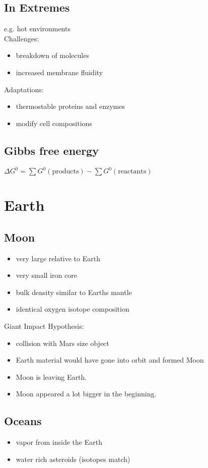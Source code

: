 \documentclass{article}
\theoremstyle{sltheorem}
\begin{document}
\subsection{In Extremes}
e.g. hot environments\\
Challenges:
\begin{itemize}
    \item breakdown of molecules
    \item increased membrane fluidity
\end{itemize}
Adaptations:
\begin{itemize}
    \item thermostable proteins and enzymes
    \item modify cell compositions
\end{itemize}
\subsection{Gibbs free energy}
$\Delta G^0 =\sum G^0(\text{products}) - \sum G^0(\text{reactants})$
\section{Earth}
\subsection{Moon}
\begin{itemize}
    \item very large relative to Earth
    \item very small iron core
    \item bulk density similar to Earths mantle
    \item identical oxygen isotope composition
\end{itemize}
Giant Impact Hypothesis:
\begin{itemize}
    \item collision with Mars size object
    \item Earth material would have gone into orbit and formed Moon
    \item Moon is leaving Earth.
    \item Moon appeared a lot bigger in the beginning.
\end{itemize}
\subsection{Oceans}
\begin{itemize}
    \item vapor from inside the Earth
    \item water rich asteroids (isotopes match)
\end{itemize}
\end{document}
